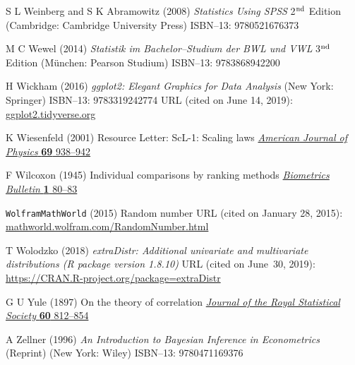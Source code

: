 \begin{thebibliography}{99}
S L Weinberg and S K Abramowitz
(2008) \textit{Statistics Using SPSS}
2$^{\rm nd}$ Edition (Cambridge: Cambridge University Press) 
ISBN--13: 9780521676373

M C Wewel
(2014) \textit{Statistik im Bachelor--Studium der BWL und VWL}
3$^{\rm nd}$ Edition (M\"unchen: Pearson Studium)
ISBN--13: 9783868942200

H Wickham
(2016) \textit{ggplot2: Elegant Graphics for Data Analysis}
(New York: Springer)
ISBN--13: 9783319242774
URL (cited on June 14, 2019): \href{https://ggplot2.tidyverse.org}{ggplot2.tidyverse.org}

K Wiesenfeld
(2001) Resource Letter: ScL-1: Scaling laws
\href{http://dx.doi.org/10.1119/1.1383601}{\textit{American Journal 
of Physics}
\textbf{69} 938--942}

F Wilcoxon
(1945) Individual comparisons by ranking methods
\href{http://www.jstor.org/stable/3001968}{\textit{Biometrics
Bulletin} \textbf{1} 80--83}

{\tt WolframMathWorld} (2015)
Random number
URL (cited on January 28, 2015):
\href{http://mathworld.wolfram.com/RandomNumber.html}{mathworld.wolfram.com/RandomNumber.html}

T Wolodzko
(2018) \textit{extraDistr: Additional univariate and multivariate
distributions (R package version 1.8.10)}
URL (cited on June~30, 2019): 
\href{https://CRAN.R-project.org/package=extraDistr}{https://CRAN.R-project.org/package=extraDistr}

G U Yule
(1897) On the theory of correlation
\href{http://dx.doi.org/10.2307/2979746}{\textit{Journal of the 
Royal Statistical Society} \textbf{60} 812--854}

A Zellner
(1996) \textit{An Introduction to Bayesian Inference in 
Econometrics} (Reprint) (New York: Wiley)
ISBN--13: 9780471169376

\end{thebibliography}

